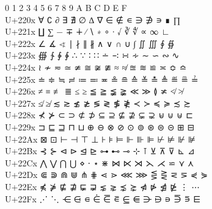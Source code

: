 \documentclass[UTF8,nofonts]{ctexart}
\begin{document}
 0 1 2 3 4 5 6 7 8 9 A B C D E F\\
U+220x  ∀ ∁ ∂ ∃ ∄ ∅ ∆ ∇ ∈ ∉ ∊ ∋ ∌ ∍ ∎ ∏\\
U+221x  ∐ ∑ − ∓ ∔ ∕ ∖ ∗ ∘ ∙ √ ∛ ∜ ∝ ∞ ∟\\
U+222x  ∠ ∡ ∢ ∣ ∤ ∥ ∦ ∧ ∨ ∩ ∪ ∫ ∬ ∭ ∮ ∯\\
U+223x  ∰ ∱ ∲ ∳ ∴ ∵ ∶ ∷ ∸ ∹ ∺ ∻ ∼ ∽ ∾ ∿\\
U+224x  ≀ ≁ ≂ ≃ ≄ ≅ ≆ ≇ ≈ ≉ ≊ ≋ ≌ ≍ ≎ ≏\\
U+225x  ≐ ≑ ≒ ≓ ≔ ≕ ≖ ≗ ≘ ≙ ≚ ≛ ≜ ≝ ≞ ≟\\
U+226x  ≠ ≡ ≢ ≣ ≤ ≥ ≦ ≧ ≨ ≩ ≪ ≫ ≬ ≭ ≮ ≯\\
U+227x  ≰ ≱ ≲ ≳ ≴ ≵ ≶ ≷ ≸ ≹ ≺ ≻ ≼ ≽ ≾ ≿\\
U+228x  ⊀ ⊁ ⊂ ⊃ ⊄ ⊅ ⊆ ⊇ ⊈ ⊉ ⊊ ⊋ ⊌ ⊍ ⊎ ⊏\\
U+229x  ⊐ ⊑ ⊒ ⊓ ⊔ ⊕ ⊖ ⊗ ⊘ ⊙ ⊚ ⊛ ⊜ ⊝ ⊞ ⊟\\
U+22Ax  ⊠ ⊡ ⊢ ⊣ ⊤ ⊥ ⊦ ⊧ ⊨ ⊩ ⊪ ⊫ ⊬ ⊭ ⊮ ⊯\\
U+22Bx  ⊰ ⊱ ⊲ ⊳ ⊴ ⊵ ⊶ ⊷ ⊸ ⊹ ⊺ ⊻ ⊼ ⊽ ⊾ ⊿\\
U+22Cx  ⋀ ⋁ ⋂ ⋃ ⋄ ⋅ ⋆ ⋇ ⋈ ⋉ ⋊ ⋋ ⋌ ⋍ ⋎ ⋏\\
U+22Dx  ⋐ ⋑ ⋒ ⋓ ⋔ ⋕ ⋖ ⋗ ⋘ ⋙ ⋚ ⋛ ⋜ ⋝ ⋞ ⋟\\
U+22Ex  ⋠ ⋡ ⋢ ⋣ ⋤ ⋥ ⋦ ⋧ ⋨ ⋩ ⋪ ⋫ ⋬ ⋭ ⋮ ⋯\\
U+22Fx  ⋰ ⋱ ⋲ ⋳ ⋴ ⋵ ⋶ ⋷ ⋸ ⋹ ⋺ ⋻ ⋼ ⋽ ⋾ ⋿\\
\end{document}
